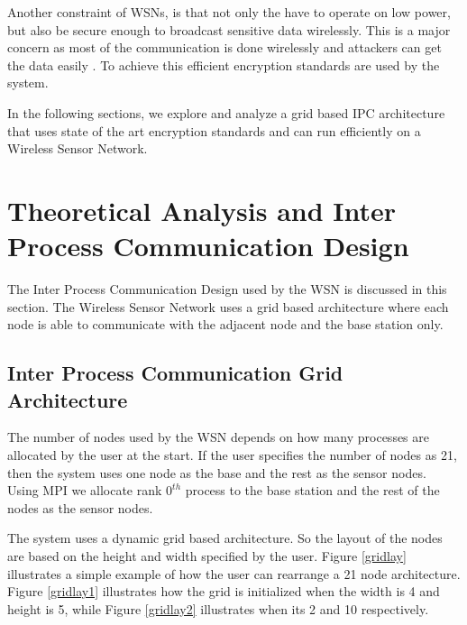 \documentclass[conference]{IEEEtran}
\begin{document}
	Another constraint of WSNs, is that not only the have to operate on low power, but also be secure enough to broadcast sensitive data wirelessly. This is a major concern as most of the communication is done wirelessly and attackers can get the data easily \cite{wn}. To achieve this efficient encryption standards are used by the system.
	
	In the following sections, we explore and analyze a grid based IPC architecture that uses state of the art encryption standards and can run efficiently on a Wireless Sensor Network.
	
	
	
	
	\section{Theoretical Analysis and Inter Process Communication Design}
	
	The Inter Process Communication Design used by the WSN is discussed in this section. The Wireless Sensor Network uses a grid based architecture where each node is able to communicate with the adjacent node and the base station only.
	
	
	\subsection{ Inter Process Communication Grid Architecture}\label{IPCArc}
	
	The number of nodes used by the WSN  depends on how many processes are allocated by the user at the start. If the user specifies the number of nodes as 21, then the system uses one node as the base and the rest as the sensor nodes. Using MPI we allocate rank $0^{th}$ process to the base station and the rest of the nodes as the sensor nodes. 
	
	The system uses a dynamic grid based architecture. So the layout of the nodes are based on the height and width specified by the user. Figure \ref{gridlay}  illustrates a simple example of how the user can rearrange a 21 node architecture. Figure \ref{gridlay1} illustrates how the grid is initialized when the width is 4 and height is 5, while Figure \ref{gridlay2} illustrates when its 2 and 10 respectively.
	
\end{document}
